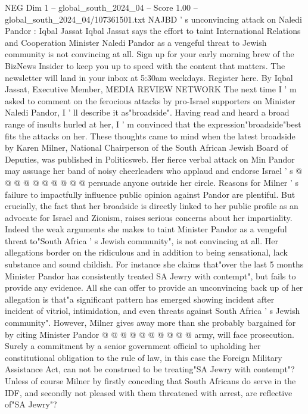 \begin{textsample}{NEG Dim 1 – global\_south\_2024\_04 – Score 1.00 – global\_south\_2024\_04/107361501.txt}  \label{ex:f1_neg_306}
NAJBD ' s unconvincing attack on Naledi Pandor : Iqbal Jassat Iqbal Jassat says the effort to taint International Relations and Cooperation Minister Naledi Pandor as a vengeful threat to Jewish community is not convincing at all.
Sign up for your early morning brew of the BizNews Insider to keep you up to speed with the content that matters.
The newsletter will land in your inbox at 5:30am weekdays.
Register here.
By Iqbal Jassat, Executive Member, MEDIA REVIEW NETWORK The next time I ' m asked to comment on the ferocious attacks by pro-Israel supporters on Minister Naledi Pandor, I ' ll describe it as"broadside".
Having read and heard a broad range of insults hurled at her, I ' m convinced that the expression"broadside"best fits the attacks on her.
These thoughts came to mind when the latest broadside by Karen Milner, National Chairperson of the South African Jewish Board of Deputies, was published in Politicsweb.
Her fierce verbal attack on Min Pandor may assuage her band of noisy cheerleaders who applaud and endorse Israel ' s @ @ @ @ @ @ @ @ @ @ persuade anyone outside her circle.
Reasons for Milner ' s failure to impactfully influence public opinion against Pandor are plentiful.
But crucially, the fact that her broadside is directly linked to her public profile as an advocate for Israel and Zionism, raises serious concerns about her impartiality.
Indeed the weak arguments she makes to taint Minister Pandor as a vengeful threat to"South Africa ' s Jewish community", is not convincing at all.
Her allegations border on the ridiculous and in addition to being sensational, lack substance and sound childish.
For instance she claims that"over the last 5 months Minister Pandor has consistently treated SA Jewry with contempt", but fails to provide any evidence.
All she can offer to provide an unconvincing back up of her allegation is that"a significant pattern has emerged showing incident after incident of vitriol, intimidation, and even threats against South Africa ' s Jewish community".
However, Milner gives away more than she probably bargained for by citing Minister Pandor @ @ @ @ @ @ @ @ @ @ army, will face prosecution.
Surely a commitment by a senior government official to upholding her constitutional obligation to the rule of law, in this case the Foreign Military Assistance Act, can not be construed to be treating"SA Jewry with contempt"?
Unless of course Milner by firstly conceding that South Africans do serve in the IDF, and secondly not pleased with them threatened with arrest, are reflective of"SA Jewry"?

\end{textsample}
